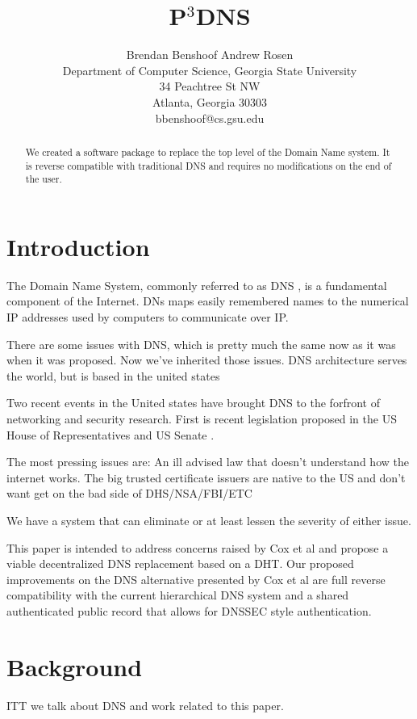 \documentclass[11pt]{IEEEtran} %
\title{P$^{3}$DNS}
\author{
Brendan Benshoof \qquad Andrew Rosen  \\Department of Computer Science, Georgia State University\\ 34 Peachtree St NW \\ Atlanta, Georgia 30303\\  bbenshoof@cs.gsu.edu }
\begin{document}
\maketitle

\begin{abstract}
We created a software package to replace the top level of the Domain Name system.  It is reverse compatible with traditional DNS and requires no modifications on the end of the user.
\end{abstract}


\section{Introduction}
The Domain Name System, commonly referred to as DNS \cite{mockapetris2003rfc} \cite{mockapetris2004rfc}, is a fundamental component of the Internet.  DNs maps easily remembered names to the numerical IP addresses used by computers to communicate over IP. 


There are some issues with DNS, which is pretty much the same now as it was when it was proposed.  Now we've inherited those issues.  DNS architecture serves the world, but is based in the united states


Two recent events in the United states have brought DNS to the forfront of networking and security research.  First is recent legislation proposed in the US House of Representatives \cite{sopa} and US Senate \cite{pipa}.


The most pressing issues are:
An ill advised law that doesn't understand how the internet works.
The big trusted certificate issuers are native to the US and don't want get on the bad side of DHS/NSA/FBI/ETC

We have a system that can eliminate or at least lessen the severity of either issue.

This paper is intended to address concerns raised by Cox et al\cite{cox} and propose a viable decentralized DNS replacement based on a DHT. Our proposed improvements on the DNS alternative presented by Cox et al are full reverse compatibility with the current hierarchical DNS system and a shared authenticated public record that allows for DNSSEC style authentication.

\section{Background}

ITT we talk about DNS and work related to this paper.
\end{document}
